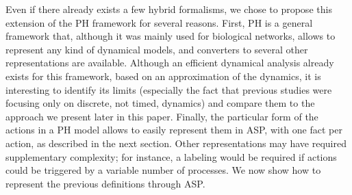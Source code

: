 Even if there already exists a few hybrid formalisms, we chose to propose this extension of the PH framework for several reasons.
First, PH is a general framework that,
although it was mainly used for biological networks,
allows to represent any kind of dynamical models,
and converters to several other representations are available.%
Although an efficient dynamical analysis already exists for this framework,
based on an approximation of the dynamics,
it is interesting to identify its limits (especially the fact that previous studies were focusing only on discrete, not timed, dynamics)
and compare them to the approach we present later in this paper.
Finally, the particular form of the actions in a PH model allows
to easily represent them in ASP,
with one fact per action, as described in the next section.
Other representations may have required supplementary complexity;
for instance, a labeling would be required
if actions could be triggered by a variable number of processes.
We now show how to represent the previous definitions through ASP.

